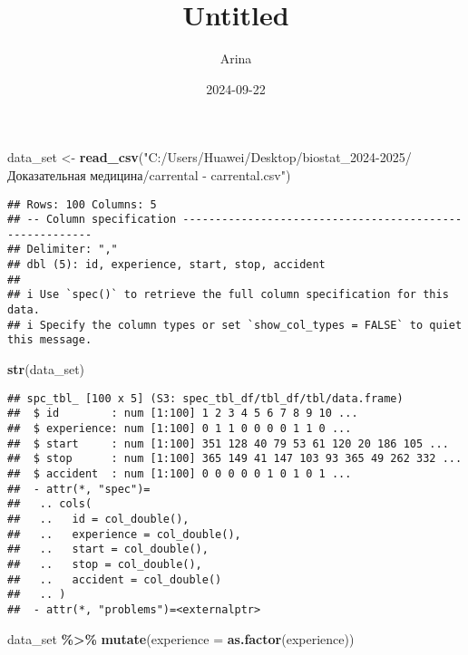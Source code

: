 \documentclass[
]{article}
\title{Untitled}
\author{Arina}
\date{2024-09-22}
\newenvironment{Shaded}{\begin{snugshade}}{\end{snugshade}}
\newcommand{\AttributeTok}[1]{\textcolor[rgb]{0.13,0.29,0.53}{#1}}
\newcommand{\FunctionTok}[1]{\textcolor[rgb]{0.13,0.29,0.53}{\textbf{#1}}}
\newcommand{\NormalTok}[1]{#1}
\newcommand{\OtherTok}[1]{\textcolor[rgb]{0.56,0.35,0.01}{#1}}
\newcommand{\SpecialCharTok}[1]{\textcolor[rgb]{0.81,0.36,0.00}{\textbf{#1}}}
\newcommand{\StringTok}[1]{\textcolor[rgb]{0.31,0.60,0.02}{#1}}
\begin{document}
\maketitle

\begin{Shaded}
\begin{Highlighting}[]
\NormalTok{data\_set }\OtherTok{\textless{}{-}} \FunctionTok{read\_csv}\NormalTok{(}\StringTok{"C:/Users/Huawei/Desktop/biostat\_2024{-}2025/Доказательная медицина/carrental {-} carrental.csv"}\NormalTok{)}
\end{Highlighting}
\end{Shaded}

\begin{verbatim}
## Rows: 100 Columns: 5
## -- Column specification --------------------------------------------------------
## Delimiter: ","
## dbl (5): id, experience, start, stop, accident
## 
## i Use `spec()` to retrieve the full column specification for this data.
## i Specify the column types or set `show_col_types = FALSE` to quiet this message.
\end{verbatim}

\begin{Shaded}
\begin{Highlighting}[]
\FunctionTok{str}\NormalTok{(data\_set)}
\end{Highlighting}
\end{Shaded}

\begin{verbatim}
## spc_tbl_ [100 x 5] (S3: spec_tbl_df/tbl_df/tbl/data.frame)
##  $ id        : num [1:100] 1 2 3 4 5 6 7 8 9 10 ...
##  $ experience: num [1:100] 0 1 1 0 0 0 0 1 1 0 ...
##  $ start     : num [1:100] 351 128 40 79 53 61 120 20 186 105 ...
##  $ stop      : num [1:100] 365 149 41 147 103 93 365 49 262 332 ...
##  $ accident  : num [1:100] 0 0 0 0 0 1 0 1 0 1 ...
##  - attr(*, "spec")=
##   .. cols(
##   ..   id = col_double(),
##   ..   experience = col_double(),
##   ..   start = col_double(),
##   ..   stop = col_double(),
##   ..   accident = col_double()
##   .. )
##  - attr(*, "problems")=<externalptr>
\end{verbatim}

\begin{Shaded}
\begin{Highlighting}[]
\NormalTok{data\_set }\SpecialCharTok{\%\textgreater{}\%}
  \FunctionTok{mutate}\NormalTok{(}\AttributeTok{experience =} \FunctionTok{as.factor}\NormalTok{(experience))}
\end{Highlighting}
\end{Shaded}
\end{document}
